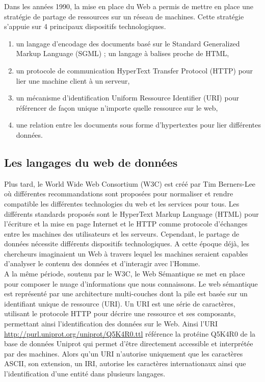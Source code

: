Dans les années 1990, la mise en place du Web a permis de mettre en place une stratégie de partage de ressources sur un réseau de machines. Cette stratégie s'appuie sur 4 principaux dispositifs technologiques.


\begin{enumerate}
\item un langage d’encodage des documents basé sur le Standard Generalized Markup Language (SGML) ; un langage à balises proche de HTML,
\item un protocole de communication HyperText Transfer Protocol (HTTP) pour lier une machine client à un serveur,
\item un mécanisme d’identification Uniform Ressource Identifier (URI) pour référencer de façon unique n’importe quelle ressource sur le web,
\item une relation entre les documents sous forme d’hypertextes pour lier différentes données.
\end{enumerate}

\subsection{Les langages du web de données}

Plus tard, le World Wide Web Consortium (W3C) est créé par Tim Berners-Lee où différentes recommandations sont proposées pour normaliser et rendre compatible les différentes technologies du web et les services pour tous. Les différents standards proposés sont le HyperText Markup Language (HTML) pour l’écriture et la mise en page Internet et le HTTP comme protocole d’échanges entre les machines des utilisateurs et les serveurs. Cependant, le partage de données nécessite différents dispositifs technologiques. A cette époque déjà, les chercheurs imaginaient un Web à travers lequel les machines seraient capables d’analyser le contenu des données et d'interagir avec l’Homme.\\

A la même période, soutenu par le W3C, le Web Sémantique se met en place pour composer le nuage d’informations que nous connaissons. Le web sémantique est représenté par une architecture multi-couches dont la pile est basée sur un identifiant unique de ressource (URI). Un URI est une série de caractères, utilisant le protocole HTTP pour décrire une ressource et ses composants, permettant ainsi l’identification des données sur le Web. Ainsi l’URI \url{http://purl.uniprot.org/uniprot/Q5K4R0.ttl} référence la protéine Q5K4R0 de la base de données Uniprot qui permet d’être directement accessible et interprétée par des machines. Alors qu'un URI n'autorise uniquement que les caractères ASCII, son extension, un IRI, autorise les caractères internationaux ainsi que l'identification d'une entité dans plusieurs langages.\\

